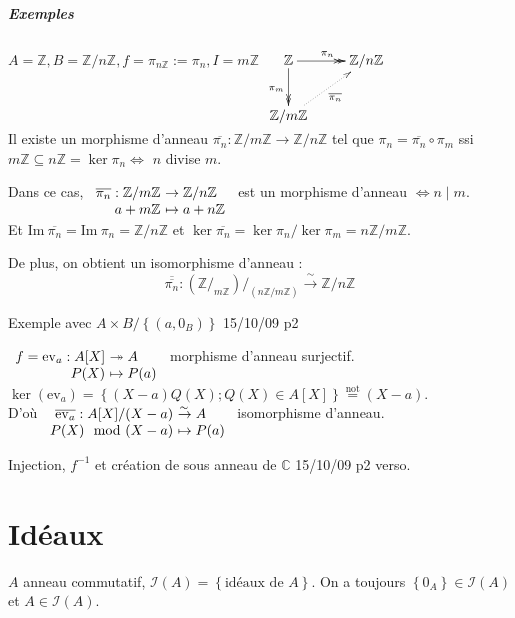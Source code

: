 \documentclass[reqno,a4paper,10pt]{report}
\makeatletter
\newcommand{\set}[1]{\left\lbrace #1 \right\rbrace} %
\newcommand{\im}{\mathrm{Im}\:} %
\newcommand{\IZ}{\ensuremath{\mathbb{Z}}\xspace} %
\newcommand{\IC}{\ensuremath{\mathbb{C}}\xspace} %
\newcommand{\surj}{\twoheadrightarrow}
\newcommand{\bij}{\overset{\!\sim}{\to}} %
\newcommand{\ev}[1]{\mathrm{ev}_{ #1 }}
\let\oldenumerate=\enumerate%
\renewenvironment{enumerate}{%
    \oldenumerate%
  }{%
    \@noparlisttrue%
    \endlist%
  }%
\makeatother
\begin{document}
\paragraph{Exemples}
\begin{enumerate}
  \item $A=\IZ, B=\IZ/n\IZ, f = \pi_{n\IZ}:=\pi_n, I = m\IZ$
    \hspace{4.2em}$\xymatrix{
    \IZ \ar@{->>}[r]^{\pi_n} \ar@{->>}[d]_{\pi_m} & \IZ/n\IZ\\
    \IZ/m\IZ \ar@{.>}[ur]_{\overline{\pi_n}}
    }$\\Il existe un morphisme d'anneau $\overline{\pi_n}: \IZ/m\IZ \to
    \IZ/n\IZ$ tel que $\pi_n=\overline{\pi_n} \circ \pi_m$ ssi $m\IZ \subseteq
    n\IZ = \ker \pi_n \iff $ $n$ divise $m$.

    Dans ce cas, $\begin{array}[t]{r@{\ }l}
      \overline{\pi_n} : \IZ/m\IZ &\to \IZ/n\IZ\\
      a+m\IZ &\mapsto a+n\IZ
    \end{array}$ est un morphisme d'anneau $\iff n \mid m$.\\
    Et $\im \overline{\pi_n}= \im \pi_n=\IZ/n\IZ$ et $\ker
    \overline{\pi_n}=\ker \pi_n/\ker \pi_m=n\IZ/m\IZ$.
    
    De plus, on obtient un isomorphisme d'anneau :
    \[\overline{\overline{\pi_n}} : \left( \IZ/_{m\IZ} \right)/_{\left(
    n\IZ/m\IZ
    \right)} \bij \IZ/n\IZ\]
  \item Exemple avec $A\times B / \set{(a,0_B)}$ 15/10/09 p2
  \item $
    \begin{array}[t]{r@{\ }l}
      f=\ev a : A[X] &\surj A\\
      P(X) &\mapsto P(a)
    \end{array}
    $ morphisme d'anneau surjectif. \\$\ker(\ev a) = \set{(X-a)Q(X); Q(X) \in
    A[X]} \overset{\text{not}}{=} (X-a)$.\\
    D'où $
    \begin{array}[t]{r@{\ }l}
      \overline{\ev a} : A[X] / (X-a) &\bij A \\
      P(X) \mod (X-a) &\mapsto P(a)
    \end{array}
       $ isomorphisme d'anneau.
  \item Injection, $f^{-1}$ et création de sous anneau de $\IC$ 15/10/09 p2
    verso.
\end{enumerate}

\chapter{Idéaux}
$A$ anneau commutatif, $\mathcal{I}(A) = \set{\text{idéaux de }A}$. On a
toujours $\set{0_A} \in \mathcal{I}(A)$ et $A \in \mathcal{I}(A)$.
\end{document}
